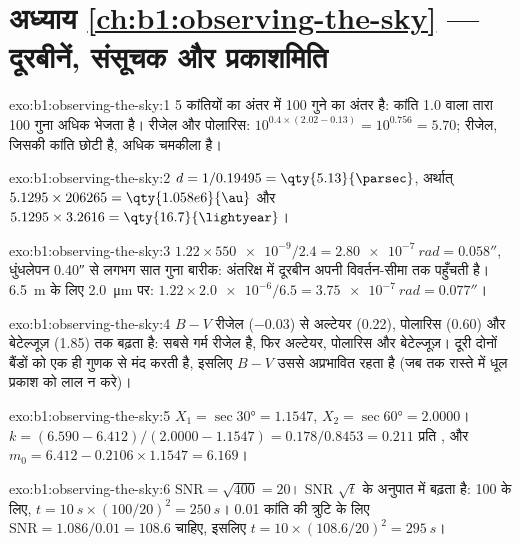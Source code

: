 \section*{अध्याय \ref{ch:b1:observing-the-sky} --- दूरबीनें, संसूचक और प्रकाशमिति}

\begin{solution}{exo:b1:observing-the-sky:1}
5 कांतियों का अंतर  में 100 गुने का अंतर है: कांति 1.0 वाला तारा 100 गुना अधिक  भेजता है।
रीजेल और पोलारिस: $10^{0.4\times(2.02 - 0.13)} =
10^{0.756} = 5.70$; रीजेल, जिसकी कांति छोटी है, अधिक चमकीला है।
\end{solution}

\begin{solution}{exo:b1:observing-the-sky:2}
$d = 1/0.19495 = \qty{5.13}{\parsec}$, अर्थात् $5.1295\times206265 =
\qty{1.058e6}{\au}$ और $5.1295\times3.2616 = \qty{16.7}{\lightyear}$।
\end{solution}

\begin{solution}{exo:b1:observing-the-sky:3}
$1.22\times\num{550e-9}/2.4 = \qty{2.80e-7}{rad} = \ang{;;0.058}$, धुंधलेपन \ang{;;0.40} से लगभग
सात गुना बारीक: अंतरिक्ष में दूरबीन अपनी विवर्तन-सीमा तक पहुँचती है। \qty{6.5}{m} के लिए
\qty{2.0}{\micro\metre} पर: $1.22\times\num{2.0e-6}/6.5 = \qty{3.75e-7}{rad} = \ang{;;0.077}$।
\end{solution}

\begin{solution}{exo:b1:observing-the-sky:4}
$B - V$ रीजेल ($-0.03$) से अल्टेयर (0.22), पोलारिस (0.60) और बेटेल्जूज़ (1.85) तक बढ़ता है: सबसे गर्म
रीजेल है, फिर अल्टेयर, पोलारिस और बेटेल्जूज़। दूरी दोनों बैंडों को एक ही गुणक से मंद करती है, इसलिए
$B - V$ उससे अप्रभावित रहता है (जब तक रास्ते में धूल प्रकाश को लाल न करे)।
\end{solution}

\begin{solution}{exo:b1:observing-the-sky:5}
$X_1 = \sec\ang{30} = 1.1547$, $X_2 = \sec\ang{60} = 2.0000$।
$k = (6.590 - 6.412)/(2.0000 - 1.1547) = 0.178/0.8453 = \num{0.211}$ प्रति , और
$m_0 = 6.412 - 0.2106\times1.1547 = 6.169$।
\end{solution}

\begin{solution}{exo:b1:observing-the-sky:6}
$\mathrm{SNR} = \sqrt{400} = 20$। SNR $\sqrt t$ के अनुपात में बढ़ता है: 100 के लिए,
$t = \qty{10}{s}\times(100/20)^2 = \qty{250}{s}$। \num{0.01} कांति की त्रुटि के लिए
$\mathrm{SNR} = 1.086/0.01 = 108.6$ चाहिए, इसलिए
$t = 10\times(108.6/20)^2 = \qty{295}{s}$।
\end{solution}

